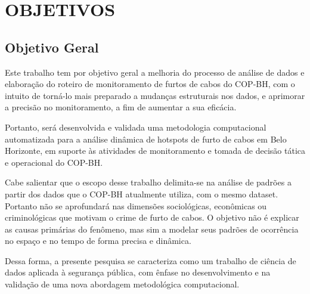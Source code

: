 \section{OBJETIVOS}
\label{sec:objetivos}

\subsection{Objetivo Geral}
\label{subsec:objgeral}
Este trabalho tem por objetivo geral a melhoria do processo de análise de dados e elaboração do roteiro de monitoramento de furtos de cabos do COP-BH, com o intuito de torná-lo mais preparado a mudanças estruturais nos dados, e aprimorar a precisão no monitoramento, a fim de aumentar a sua eficácia.

Portanto, será desenvolvida e validada uma metodologia computacional automatizada para a análise dinâmica de hotspots de furto de cabos em Belo Horizonte, em suporte às atividades de monitoramento e tomada de decisão tática e operacional do COP-BH.

Cabe salientar que o escopo desse trabalho delimita-se na análise de padrões a partir dos dados que o COP-BH atualmente utiliza, com o mesmo dataset. Portanto não se aprofundará nas dimensões sociológicas, econômicas ou criminológicas que motivam o crime de furto de cabos. O objetivo não é explicar as causas primárias do fenômeno, mas sim a modelar seus padrões de ocorrência no espaço e no tempo de forma precisa e dinâmica.

Dessa forma, a presente pesquisa se caracteriza como um trabalho de ciência de dados aplicada à segurança pública, com ênfase no desenvolvimento e na validação de uma nova abordagem metodológica computacional.

